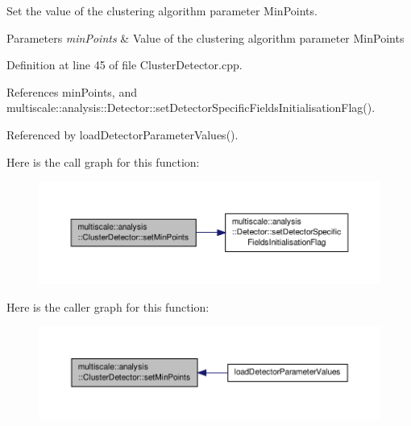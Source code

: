 Set the value of the clustering algorithm parameter Min\-Points. 


\begin{DoxyParams}{Parameters}
{\em min\-Points} & Value of the clustering algorithm parameter Min\-Points \\
\hline
\end{DoxyParams}


Definition at line 45 of file Cluster\-Detector.\-cpp.



References min\-Points, and multiscale\-::analysis\-::\-Detector\-::set\-Detector\-Specific\-Fields\-Initialisation\-Flag().



Referenced by load\-Detector\-Parameter\-Values().



Here is the call graph for this function\-:\nopagebreak
\begin{figure}[H]
\begin{center}
\leavevmode
\includegraphics[width=350pt]{classmultiscale_1_1analysis_1_1ClusterDetector_a190fd17d121e8c22c1ca6e4f5b7a213c_cgraph}
\end{center}
\end{figure}




Here is the caller graph for this function\-:\nopagebreak
\begin{figure}[H]
\begin{center}
\leavevmode
\includegraphics[width=350pt]{classmultiscale_1_1analysis_1_1ClusterDetector_a190fd17d121e8c22c1ca6e4f5b7a213c_icgraph}
\end{center}
\end{figure}


